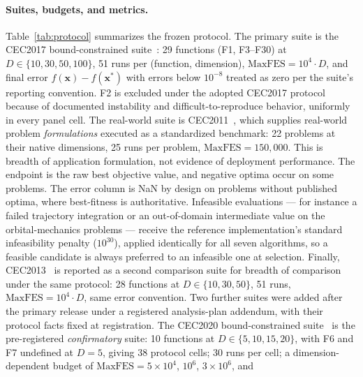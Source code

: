 \paragraph{Suites, budgets, and metrics.}
Table~\ref{tab:protocol} summarizes the frozen protocol. The primary
suite is the CEC2017 bound-constrained suite~\cite{awad2016problem}:
29 functions (F1, F3--F30) at $D \in \{10, 30, 50, 100\}$, 51 runs per
(function, dimension), $\mathrm{MaxFES} = 10^{4} \cdot D$, and final
error $f(\mathbf{x}) - f(\mathbf{x}^{*})$ with errors below $10^{-8}$
treated as zero per the suite's reporting convention. F2 is excluded under the
adopted CEC2017 protocol because of documented instability and
difficult-to-reproduce behavior, uniformly in every panel cell.
The real-world suite is CEC2011~\cite{das2011cec2011}, which supplies
real-world problem \emph{formulations} executed as a standardized benchmark:
22 problems at their native dimensions, 25 runs per problem,
$\mathrm{MaxFES} = 150{,}000$. This is breadth of application formulation,
not evidence of deployment performance. The endpoint is the raw best objective
value, and negative optima occur on some problems. The error column
is NaN by design on problems without published optima, where
best-fitness is authoritative.
Infeasible evaluations --- for instance a failed trajectory integration
or an out-of-domain intermediate value on the orbital-mechanics problems
--- receive the reference implementation's standard infeasibility penalty ($10^{30}$),
applied identically for all seven algorithms, so a feasible candidate is
always preferred to an infeasible one at selection.
Finally, CEC2013~\cite{liang2013cec2013} is reported as a second
comparison suite for breadth of comparison under the same protocol:
28 functions at $D \in \{10, 30, 50\}$, 51 runs,
$\mathrm{MaxFES} = 10^{4} \cdot D$, same error convention.
Two further suites were added after the primary release under a
registered analysis-plan addendum, with their protocol facts fixed at
registration. The CEC2020 bound-constrained suite~\cite{yue2020cec2020}
is the pre-registered \emph{confirmatory} suite: 10 functions at
$D \in \{5, 10, 15, 20\}$, with F6 and F7 undefined at $D = 5$, giving
38 protocol cells; 30 runs per cell; a dimension-dependent budget of
$\mathrm{MaxFES} = 5 \times 10^{4}$, $10^{6}$, $3 \times 10^{6}$, and
